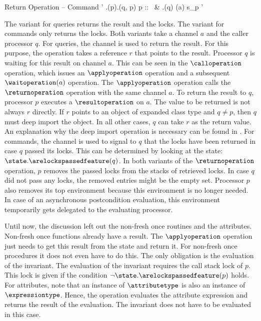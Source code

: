 \inferencerule
	{Return Operation -- Command}
	{\state' \mathematicaldefinition \state.\popenvironmentfeature(p).\revokelocksfeature(q, p)}
	{}
	{
		\configuration
			{
				p :: \ & \singlelineconditionaloperation
					{\state.\arelockspassedfeature(q)}
					{\notifyoperation(a)}
					{\nooperation} \statementseparator
				s_{p}
			}
			{\state'}
	}
 
The variant for queries returns the result and the locks. The variant for commands only returns the locks. Both variants take a channel $a$ and the caller processor $q$. For queries, the channel is used to return the result. For this purpose, the operation takes a reference $r$ that points to the result. Processor $q$ is waiting for this result on channel $a$. This can be seen in the $\calloperation$ operation, which issues an $\applyoperation$ operation and a subsequent $\waitoperation(a)$ operation. The $\applyoperation$ operation calls the $\returnoperation$ operation with the same channel $a$. To return the result to $q$, processor $p$ executes a $\resultoperation$ on $a$. The value to be returned is not always $r$ directly. If $r$ points to an object of expanded class type and $q \neq p$, then $q$ must deep import the object. In all other cases, $q$ can take $r$ as the return value. An explanation why the deep import operation is necessary can be found in . For commands, the channel is used to signal to $q$ that the locks have been returned in case $q$ passed its locks. This can be determined by looking at the state: $\state.\arelockspassedfeature(q)$. In both variants of the $\returnoperation$ operation, $p$ removes the passed locks from the stacks of retrieved locks. In case $q$ did not pass any locks, the removed entries might be the empty set. Processor $p$ also removes its top environment because this environment is no longer needed. In case of an asynchronous postcondition evaluation, this environment temporarily gets delegated to the evaluating processor.

Until now, the discussion left out the non-fresh once routines and the attributes. Non-fresh once functions already have a result. The $\applyoperation$ operation just needs to get this result from the state and return it. For non-fresh once procedures it does not even have to do this. The only obligation is the evaluation of the invariant. The evaluation of the invariant requires the call stack lock of $p$. This lock is given if the condition $\neg \state.\arelockspassedfeature(p)$ holds. For attributes, note that an instance of $\attributetype$ is also an instance of $\expressiontype$. Hence, the operation evaluates the attribute expression and returns the result of the evaluation. The invariant does not have to be evaluated in this case.

